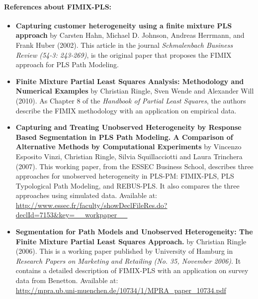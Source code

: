 \documentclass[12pt]{book}\usepackage{graphicx, color}
\begin{document}
\paragraph{References about FIMIX-PLS:} 
\begin{itemize}
 \vspace{2mm}
 \item \textsf{\textbf{Capturing customer heterogeneity using a finite mixture PLS approach}} by Carsten Hahn, Michael D. Johnson, Andreas Herrmann, and Frank Huber (2002). This article in the journal \textit{Schmalenbach Business Review (54-3: 243-269)}, is the original paper that proposes the FIMIX approach for PLS Path Modeling.

 \vspace{2mm}
 \item \textsf{\textbf{Finite Mixture Partial Least Squares Analysis: Methodology and Numerical Examples}} by Christian Ringle, Sven Wende and Alexander Will (2010). As Chapter 8 of the \textit{Handbook of Partial Least Squares}, the authors describe the FIMIX methodology with an application on empirical data. 

 \vspace{2mm}
 \item \textsf{\textbf{Capturing and Treating Unobserved Heterogeneity by Response Based Segmentation in PLS Path Modeling. A Comparison of Alternative Methods by Computational Experiments}} by Vincenzo Esposito Vinzi, Christian Ringle, Silvia Squillacciotti and Laura Trinchera (2007). This working paper, from the ESSEC Business School, describes three approaches for unobserved heterogeneity in PLS-PM: FIMIX-PLS, PLS Typological Path Modeling, and REBUS-PLS. It also compares the three approaches using simulated data. Available at: \\
 \href{http://www.essec.fr/faculty/showDeclFileRes.do?declId=7153&key=__workpaper__}{http://www.essec.fr/faculty/showDeclFileRes.do?declId=7153\&key=\_\_workpaper\_\_}

\vspace{2mm}
 \item \textsf{\textbf{Segmentation for Path Models and Unobserved Heterogeneity: The Finite Mixture Partial Least Squares Approach.}} by Christian Ringle (2006). This is a working paper published by University of Hamburg in \textit{Research Papers on Marketing and Retailing (No. 35, November 2006)}. It contains a detailed description of FIMIX-PLS with an application on survey data from Benetton. Available at: \\
 \href{http://mpra.ub.uni-muenchen.de/10734/1/MPRA_paper_10734.pdf}{http://mpra.ub.uni-muenchen.de/10734/1/MPRA\_paper\_10734.pdf}
\end{itemize}
\end{document}
